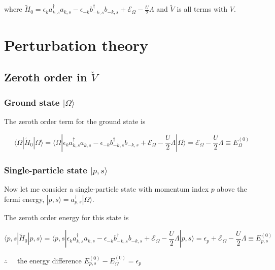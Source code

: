 \documentclass[
  letterpaper,
  DIV=11,
  numbers=noendperiod]{scrartcl}
\begin{document}
where
\(\tilde H_0=\epsilon_{k}a^{\dagger}_{k,s}a^{}_{k,s}-\epsilon_{-k}b^{\dagger}_{-k,s}b^{}_{-k,s}+\mathcal{E}_{\Omega}-\frac{U}{2}\Lambda\)
and \(\tilde V\) is all terms with \(V\).

\section{Perturbation theory}\label{perturbation-theory}

\subsection{\texorpdfstring{Zeroth order in
\(\tilde V\)}{Zeroth order in \textbackslash tilde V}}\label{zeroth-order-in-tilde-v}

\subsubsection{\texorpdfstring{Ground state
\(|\Omega\rangle\)}{Ground state \textbar\textbackslash Omega\textbackslash rangle}}\label{ground-state-omegarangle}

The zeroth order term for the ground state is

\[
\langle \Omega|\tilde H_0|\Omega\rangle=\langle\Omega|\epsilon_{k}a^{\dagger}_{k,s}a^{}_{k,s}-\epsilon_{-k}b^{\dagger}_{-k,s}b^{}_{-k,s}+\mathcal{E}_{\Omega}-\frac{U}{2}\Lambda|\Omega\rangle=\mathcal{E}_{\Omega}-\frac{U}{2}\Lambda\equiv E^{(0)}_\Omega
\]

\subsubsection{\texorpdfstring{Single-particle state
\(|p,s\rangle\)}{Single-particle state \textbar p,s\textbackslash rangle}}\label{single-particle-state-psrangle}

Now let me consider a single-particle state with momentum index \(p\)
above the fermi energy, \(|p,s\rangle=a^\dagger_{p,s}|\Omega\rangle\).

The zeroth order energy for this state is

\[
\langle p,s|\tilde H_0|p,s\rangle=\langle p,s|\epsilon_{k}a^{\dagger}_{k,s}a^{}_{k,s}-\epsilon_{-k}b^{\dagger}_{-k,s}b^{}_{-k,s}+\mathcal{E}_{\Omega}-\frac{U}{2}\Lambda|p,s\rangle=\epsilon_p+\mathcal{E}_{\Omega}-\frac{U}{2}\Lambda\equiv E^{(0)}_{p,s}
\]

\begin{tcolorbox}[enhanced jigsaw, arc=.35mm, bottomrule=.15mm, bottomtitle=1mm, breakable, colback=white, colbacktitle=quarto-callout-note-color!10!white, colframe=quarto-callout-note-color-frame, coltitle=black, left=2mm, leftrule=.75mm, opacityback=0, opacitybacktitle=0.6, rightrule=.15mm, title=\textcolor{quarto-callout-note-color}{\faInfo}\hspace{0.5em}{Energy difference at \(\mathcal{O}(V^0)\)}, titlerule=0mm, toprule=.15mm, toptitle=1mm]

\(\therefore\quad\) the energy difference
\(E^{(0)}_{p,s}-E^{(0)}_\Omega=\epsilon_p\)

\end{tcolorbox}
\end{document}
